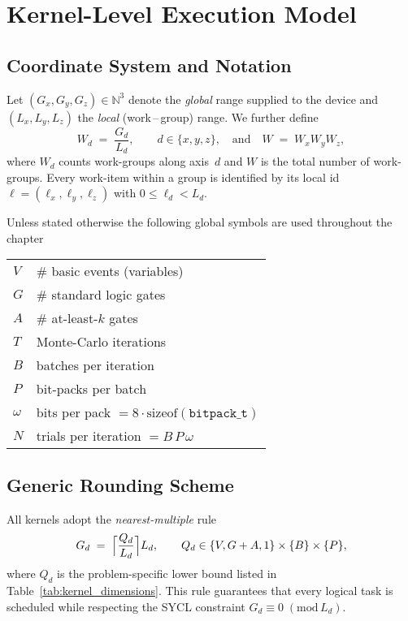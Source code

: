 \section{Kernel-Level Execution Model}
\label{sec:kernel_execution_model}

\subsection{Coordinate System and Notation}

Let $(G_x,G_y,G_z)\in\mathbb{N}^3$ denote the \emph{global} range supplied to the device and $(L_x,L_y,L_z)$ the \emph{local} (work\,–\,group) range.  We further define
\[
  W_d \;=\; \frac{G_d}{L_d},\qquad d\in\{x,y,z\},
  \quad\text{and}\quad
  W \;=\; W_x W_y W_z ,
\]
where $W_d$ counts work-groups along axis~$d$ and $W$ is the total number of work-groups.  Every work-item within a group is identified by its local id $\ell=(\ell_x,\ell_y,\ell_z)$ with $0\le \ell_d<L_d$.

Unless stated otherwise the following global symbols are used throughout the chapter
\begin{center}
\begin{tabular}{ll}
$V$  & \# basic events (variables)\\
$G$  & \# standard logic gates\\
$A$  & \# at-least-$k$ gates\\
$T$  & Monte-Carlo iterations\\
$B$  & batches per iteration\\
$P$  & bit-packs per batch\\
$\omega$ & bits per pack $=8\cdot\mathrm{sizeof}(\texttt{bitpack\_t})$\\
$N$  & trials per iteration $=B\,P\,\omega$
\end{tabular}
\end{center}

\subsection{Generic Rounding Scheme}

All kernels adopt the \emph{nearest-multiple} rule
\[
   G_d \;=\;
   \Bigl\lceil \frac{Q_d}{L_d} \Bigr\rceil L_d ,\qquad
   Q_d \in \{V,G+A,1\}\times\{B\}\times\{P\},
\]
where $Q_d$ is the problem-specific lower bound listed in Table~\ref{tab:kernel_dimensions}.  This rule guarantees that every logical task is scheduled while respecting the SYCL constraint $G_d\equiv 0 \; (\mathrm{mod}\,L_d)$.

